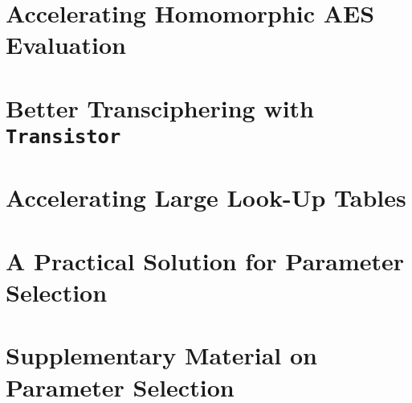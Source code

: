 \documentclass[11pt, twoside, openright]{thesis}
\begin{document}

\mainmatter














\cleardoublepage














\chapter{Accelerating Homomorphic AES Evaluation}
\label{chap:hyppogriph}



\chapter[Better Transciphering with Transistor]{Better Transciphering with \texttt{Transistor}}
\label{chap:transistor}



\chapter{Accelerating Large Look-Up Tables}
\label{chap:larger_lut}



\chapter{A Practical Solution for Parameter Selection}
\label{chap:parameters}





\printbibliography



\appendix
\chapter{Supplementary Material on Parameter Selection}







\end{document}
